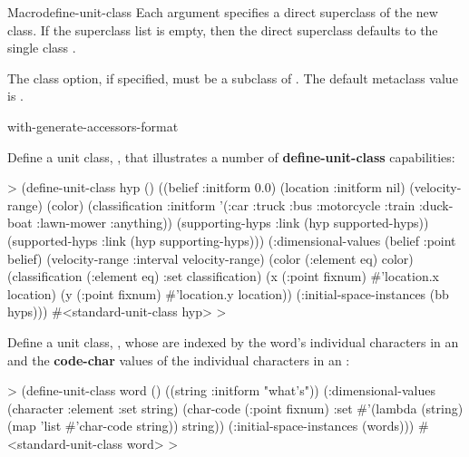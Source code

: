 \documentclass[10pt,twoside,english,pdftex]{article}
\begin{document}
\begin{functiondoc}{Macro}{define-unit-class}
%
Each  argument specifies a direct superclass of the new
class. If the superclass list is empty, then the direct superclass defaults to the
single class \textbf{}.

%
The  class option, if specified, must be a subclass
of \textbf{}.  The default metaclass
value is \textbf{}.

\classoptioninheritance

\begin{alsos}{with-generate-accessors-format}
\end{alsos}

\fnexamples
%
Define a unit class, , that illustrates a number of
\textbf{define-unit-class} capabilities:
%
\W\supp
\begin{example}
  > (define-unit-class hyp ()
      ((belief :initform 0.0)
       (location :initform nil)
       (velocity-range)
       (color)
       (classification :initform '(:car :truck :bus :motorcycle :train :duck-boat 
                                   :lawn-mower :anything))
       (supporting-hyps 
        :link (hyp supported-hyps))
       (supported-hyps 
        :link (hyp supporting-hyps)))
      (:dimensional-values 
       (belief :point belief)
       (velocity-range :interval velocity-range)
       (color (:element eq) color)
       (classification (:element eq) :set classification)
       (x (:point fixnum) #'location.x location)
       (y (:point fixnum) #'location.y location))
      (:initial-space-instances (bb hyps)))
  #<standard-unit-class hyp>
  >
\end{example}

Define a unit class, , whose  are indexed by the
word's individual characters in an  and the
\textbf{code-char} values of the individual characters in an
:
%
\W\supp
\begin{example}
  > (define-unit-class word ()
      ((string :initform "what's"))
      (:dimensional-values
       (character :element :set string)
       (char-code (:point fixnum) :set 
                  #'(lambda (string)
                      (map 'list #'char-code string))
                  string))
      (:initial-space-instances (words)))
  #<standard-unit-class word>
  >
\end{example}

\end{functiondoc}
\end{document}
